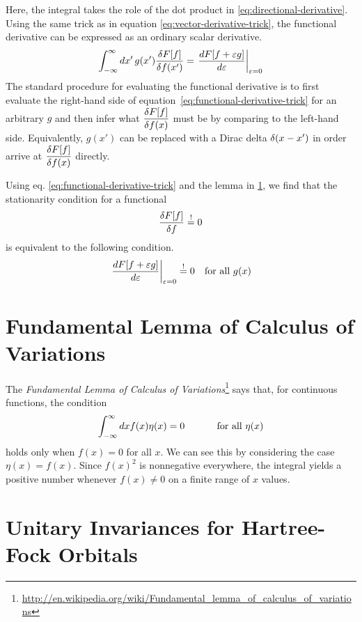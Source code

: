 \documentclass[11pt]{article}
\numberwithin{equation}{section}
\begin{document}
Here, the integral takes the role of the dot product in \ref{eq:directional-derivative}.
Using the same trick as in equation \ref{eq:vector-derivative-trick}, the functional derivative can be expressed as an ordinary scalar derivative.
\begin{align}
\label{eq:functional-derivative-trick}
  \int_{-\infty}^{\infty}
  dx'\,
  g(x')
  \fr{\d F[f]}{\d f(x')}
=
  \left.
  \fd{F[f+\e g]}{\e}
  \right|_{\e=0}
\end{align}
The standard procedure for evaluating the functional derivative is to first evaluate the right-hand side of equation~\ref{eq:functional-derivative-trick} for an arbitrary $g$ and then infer what $\dfr{\d F[f]}{\d f(x)}$ must be by comparing to the left-hand side.
Equivalently, $g(x')$ can be replaced with a Dirac delta $\d(x-x')$ in order arrive at $\dfr{\d F[f]}{\d f(x)}$ directly.

Using eq. \ref{eq:functional-derivative-trick} and the lemma in \cref{app:fundamental-lemma-of-calculus-of-variations}, we find that the stationarity condition for a functional
\begin{align}
  \fr{\d F[f]}{\d f}
\overset{!}{=}
  0
\end{align}
is equivalent to the following condition.
\begin{align}
  \left.
  \fd{F[f+\e g]}{\e}
  \right|_{\e=0}
\overset{!}{=}
  0
&&
  \text{for all $g(x)$}
\end{align}


\newpage
\section{Fundamental Lemma of Calculus of Variations}\label{app:fundamental-lemma-of-calculus-of-variations}
The \textit{Fundamental Lemma of Calculus of Variations}\footnote{\url{http://en.wikipedia.org/wiki/Fundamental_lemma_of_calculus_of_variations}} says that, for continuous functions, the condition
\begin{align}
  \int_{-\infty}^\infty dx f(x)\eta(x)
=
  0
\sp\text{ for all $\eta(x)$}
\end{align}
holds only when $f(x)=0$ for all $x$.
We can see this by considering the case $\eta(x)=f(x)$.
Since $f(x)^2$ is nonnegative everywhere, the integral yields a positive number whenever $f(x)\neq 0$ on a finite range of $x$ values.



\newpage
\section{Unitary Invariances for Hartree-Fock Orbitals}\label{app:hartree-fock-orbital-invariance}
\end{document}
